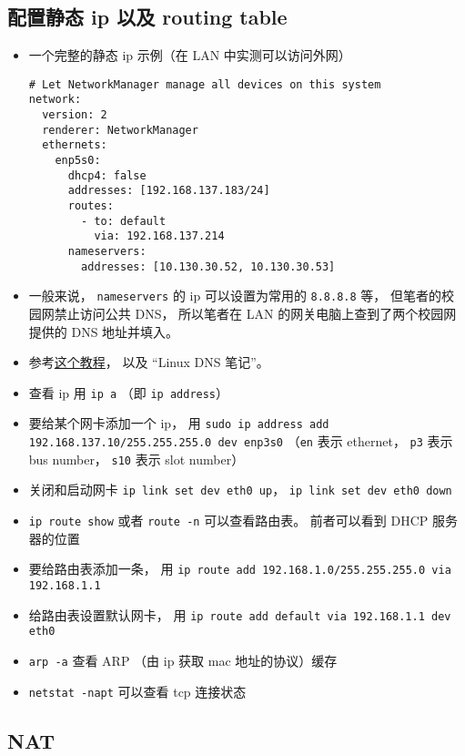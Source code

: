 \subsection{配置静态 ip 以及 routing table}
\begin{itemize}
\item 一个完整的静态 ip 示例（在 LAN 中实测可以访问外网）
\begin{lstlisting}[language=none, caption=01-network-manager-all.yaml]
# Let NetworkManager manage all devices on this system
network:
  version: 2
  renderer: NetworkManager
  ethernets:
    enp5s0:
      dhcp4: false
      addresses: [192.168.137.183/24]
      routes:
        - to: default
          via: 192.168.137.214
      nameservers:
        addresses: [10.130.30.52, 10.130.30.53]
\end{lstlisting}
\item 一般来说， \verb|nameservers| 的 ip 可以设置为常用的 \verb|8.8.8.8| 等， 但笔者的校园网禁止访问公共 DNS， 所以笔者在 LAN 的网关电脑上查到了两个校园网提供的 DNS 地址并填入。
\item 参考\href{https://linuxiac.com/how-to-set-static-ip-address-and-modifying-routing-table-on-linux/}{这个教程}， 以及 “Linux DNS 笔记”。
\item 查看 ip 用 \verb|ip a| （即 \verb|ip address|）
\item 要给某个网卡添加一个 ip， 用 \verb|sudo ip address add 192.168.137.10/255.255.255.0 dev enp3s0| （\verb|en| 表示 ethernet， \verb|p3| 表示 bus number， \verb|s10| 表示 slot number）
\item 关闭和启动网卡 \verb|ip link set dev eth0 up|， \verb|ip link set dev eth0 down|
\item \verb|ip route show| 或者 \verb|route -n| 可以查看路由表。 前者可以看到 DHCP 服务器的位置
\item 要给路由表添加一条， 用 \verb|ip route add 192.168.1.0/255.255.255.0 via 192.168.1.1|
\item 给路由表设置默认网卡， 用 \verb|ip route add default via 192.168.1.1 dev eth0|
\item \verb|arp -a| 查看 ARP （由 ip 获取 mac 地址的协议）缓存
\item \verb|netstat -napt| 可以查看 tcp 连接状态
\end{itemize}


\subsection{NAT}
